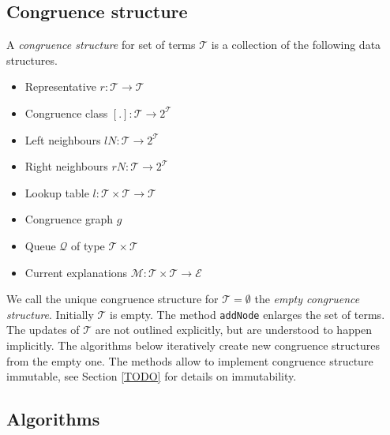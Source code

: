 %

\subsection*{Congruence structure}

A \emph{congruence structure} for set of terms $\mathcal{T}$ is a collection of the following data structures.

\begin{itemize}
	\item Representative $r: \mathcal{T} \rightarrow \mathcal{T}$
	\item Congruence class $[.]: \mathcal{T} \rightarrow 2^\mathcal{T}$
	\item Left neighbours $lN: \mathcal{T} \rightarrow 2^\mathcal{T}$
	\item Right neighbours $rN: \mathcal{T} \rightarrow 2^\mathcal{T}$
	\item Lookup table $l: \mathcal{T} \times \mathcal{T} \rightarrow \mathcal{T}$
	\item Congruence graph $g$
	\item Queue $\mathcal{Q}$ of type $\mathcal{T} \times \mathcal{T}$
	\item Current explanations $\mathcal{M}: \mathcal{T} \times \mathcal{T} \rightarrow \mathcal{E}$
\end{itemize}

We call the unique congruence structure for $\mathcal{T} = \emptyset$ the \emph{empty congruence structure}.
Initially $\mathcal{T}$ is empty.
The method \texttt{addNode} enlarges the set of terms.
The updates of $\mathcal{T}$ are not outlined explicitly, but are understood to happen implicitly.
The algorithms below iteratively create new congruence structures from the empty one.
The methods allow to implement congruence structure immutable, see Section \ref{TODO} for details on immutability.

\subsection*{Algorithms}





